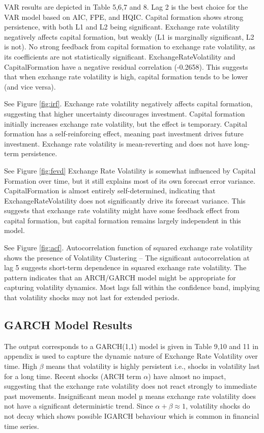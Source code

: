 \documentclass{article} %
\begin{document}
VAR results are depicted in Table 5,6,7 and 8. Lag 2 is the best choice for the VAR model based on AIC, FPE, and HQIC. Capital formation shows strong persistence, with both L1 and L2 being significant. Exchange rate volatility negatively affects capital formation, but weakly (L1 is marginally significant, L2 is not). No strong feedback from capital formation to exchange rate volatility, as its coefficients are not statistically significant. ExchangeRateVolatility and CapitalFormation have a negative residual correlation (-0.2658). This suggests that when exchange rate volatility is high, capital formation tends to be lower (and vice versa).

See Figure \ref{fig:irf}. Exchange rate volatility negatively affects capital formation, suggesting that higher uncertainty discourages investment. Capital formation initially increases exchange rate volatility, but the effect is temporary. Capital formation has a self-reinforcing effect, meaning past investment drives future investment. Exchange rate volatility is mean-reverting and does not have long-term persistence.


See Figure \ref{fig:fevd} Exchange Rate Volatility is somewhat influenced by Capital Formation over time, but it still explains most of its own forecast error variance. CapitalFormation is almost entirely self-determined, indicating that ExchangeRateVolatility does not significantly drive its forecast variance. This suggests that exchange rate volatility might have some feedback effect from capital formation, but capital formation remains largely independent in this model.


See Figure \ref{fig:acf}. Autocorrelation function of squared exchange rate volatility shows the presence of Volatility Clustering – The significant autocorrelation at lag 5 suggests short-term dependence in squared exchange rate volatility. The pattern indicates that an ARCH/GARCH model might be appropriate for capturing volatility dynamics. Most lags fall within the confidence band, implying that volatility shocks may not last for extended periods.

\subsection{GARCH Model Results}
The output corresponds to a GARCH(1,1) model is given in Table 9,10 and 11 in appendix is used to capture the dynamic nature of Exchange Rate Volatility over time. High $\beta$ means that volatility is highly persistent i.e., shocks in volatility last for a long time. Recent shocks (ARCH term $\alpha$) have almost no impact, suggesting that the exchange rate volatility does not react strongly to immediate past movements. Insignificant mean model µ means exchange rate volatility does not have a significant deterministic trend. Since $\alpha + \beta  \approx 1$, volatility shocks do not decay which shows possible IGARCH behaviour which is common in financial time series.
\end{document}
